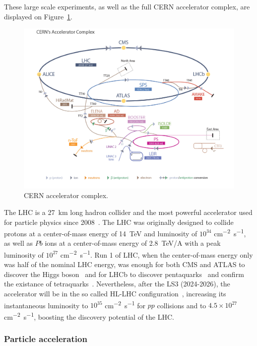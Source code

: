 	These large scale experiments, as well as the full CERN accelerator complex, are displayed on Figure~\ref{fig:CERNComplex}.

	\begin{figure}[H]
		\centering
		\hspace*{-0.1\linewidth}
		\includegraphics[width=1.2\linewidth]{fig/chapt2/CERN_Accelerator_Complex.png}
		\caption{\label{fig:CERNComplex} CERN accelerator complex.}
	\end{figure}
	
	The LHC is a \SI{27}{km} long hadron collider and the most powerful accelerator used for particle physics since 2008~\cite{LHC2008}. The LHC was originally designed to collide protons at a center-of-mass energy of \SI{14}{TeV} and luminosity of $10^{34}$ \si{cm^{-2}s^{-1}}, as well as $Pb$ ions at a center-of-mass energy of \SI{2.8}{TeV/A} with a peak luminosity of $10^{27}$ \si{cm^{-2}s^{-1}}. Run 1 of LHC, when the center-of-mass energy only was half of the nominal LHC energy, was enough for both CMS and ATLAS to discover the Higgs boson~\cite{HIGGS2015} and for LHCb to discover pentaquarks~\cite{PENTAQUARK2015} and confirm the existance of tetraquarks~\cite{TETRAQUARK2017}. Nevertheless, after the \acf{LS3} (2024-2026), the accelerator will be in the so called \acf{HL-LHC} configuration~\cite{HLLHC2017}, increasing its instantaneous luminosity to $10^{35}$ \si{cm^{-2}s^{-1}} for $pp$ collisions and to $4.5\times 10^{27}$ \si{cm^{-2}s^{-1}}, boosting the discovery potential of the LHC.
	
		\subsubsection{Particle acceleration}
		\label{chapt2:sssec:acceleration}
	
